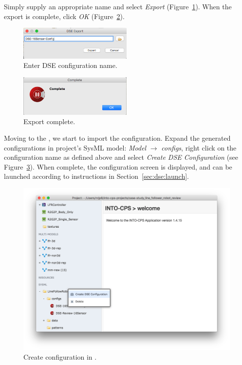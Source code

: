 Simply supply an appropriate name and select \textit{Export} (Figure~\ref{fig:dse:edit:sysml-generate-name2}). When the export is complete, click \textit{OK} (Figure~\ref{fig:dse:edit:sysml-generate-complete}).
%
%
%
\begin{figure}[ht]
	\centering
	\includegraphics[width=0.5\textwidth]{figures/dse/sysml-generate-name2}
	\caption{Enter DSE configuration name.}\label{fig:dse:edit:sysml-generate-name2}
\end{figure}
%
%
%
\begin{figure}[ht]
	\centering
	\includegraphics[width=0.5\textwidth]{figures/dse/sysml-generate-complete}
	\caption{Export complete.}\label{fig:dse:edit:sysml-generate-complete}
\end{figure}
%
%
%

Moving to the \intoapp{}, we start to import the configuration. Expand the generated configurations in project's SysML model: \textit{Model}  $\rightarrow$ \textit{configs}, right click on the configuration name as defined above and select \textit{Create DSE Configuration} (see Figure~\ref{fig:dse:edit:sysml-app-menu}). When complete, the configuration screen is displayed, and can be launched according to instructions in Section~\ref{sec:dse:launch}.
%
%
%
\begin{figure}[ht]
	\centering
	\includegraphics[width=\textwidth]{figures/dse/sysml-app-menu}
	\caption{Create configuration in \intoapp{}.}\label{fig:dse:edit:sysml-app-menu}
\end{figure}
\clearpage




